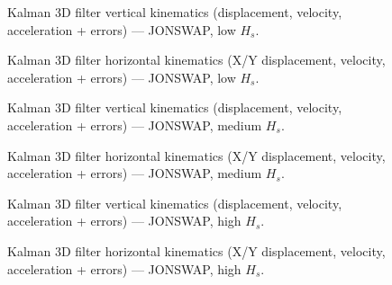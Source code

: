 \documentclass[11pt,letterpaper]{article}
\begin{document}
\begin{figure}[H]\centering
  \resizebox{\textwidth}{!}{}
  \caption{Kalman 3D filter vertical kinematics (displacement, velocity, acceleration + errors) — JONSWAP, low $H_s$.}
  \label{fig:w3d_jonswap_low_zkin}
\end{figure}

\begin{figure}[H]\centering
  \resizebox{\textwidth}{!}{}
  \caption{Kalman 3D filter horizontal kinematics (X/Y displacement, velocity, acceleration + errors) — JONSWAP, low $H_s$.}
  \label{fig:w3d_jonswap_low_xykin}
\end{figure}


\begin{figure}[H]\centering
  \resizebox{\textwidth}{!}{}
  \caption{Kalman 3D filter vertical kinematics (displacement, velocity, acceleration + errors) — JONSWAP, medium $H_s$.}
  \label{fig:w3d_jonswap_medium_zkin}
\end{figure}

\begin{figure}[H]\centering
  \resizebox{\textwidth}{!}{}
  \caption{Kalman 3D filter horizontal kinematics (X/Y displacement, velocity, acceleration + errors) — JONSWAP, medium $H_s$.}
  \label{fig:w3d_jonswap_medium_xykin}
\end{figure}


\begin{figure}[H]\centering
  \resizebox{\textwidth}{!}{}
  \caption{Kalman 3D filter vertical kinematics (displacement, velocity, acceleration + errors) — JONSWAP, high $H_s$.}
  \label{fig:w3d_jonswap_high_zkin}
\end{figure}

\begin{figure}[H]\centering
  \resizebox{\textwidth}{!}{}
  \caption{Kalman 3D filter horizontal kinematics (X/Y displacement, velocity, acceleration + errors) — JONSWAP, high $H_s$.}
  \label{fig:w3d_jonswap_high_xykin}
\end{figure}
\end{document}
